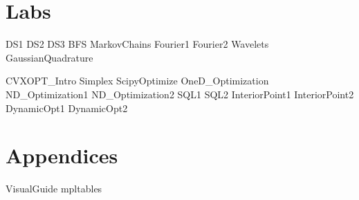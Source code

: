 \documentclass[nociteref]{SIAM-GH-book}
\begin{document}
\setcounter{tocdepth}{1}
\tableofcontents

\mainmatter %

\part{Labs}
{DS1}
{DS2}
{DS3}
{BFS}
{MarkovChains}
{Fourier1}
{Fourier2}
{Wavelets}
{GaussianQuadrature}

{CVXOPT_Intro}
{Simplex}
{ScipyOptimize}
{OneD_Optimization}
{ND_Optimization1}
{ND_Optimization2}
{SQL1}
{SQL2}
{InteriorPoint1}
{InteriorPoint2}
{DynamicOpt1}
{DynamicOpt2}

\part{Appendices}
\begin{appendices}
{VisualGuide}
{mpltables}
\end{appendices}
\end{document}
